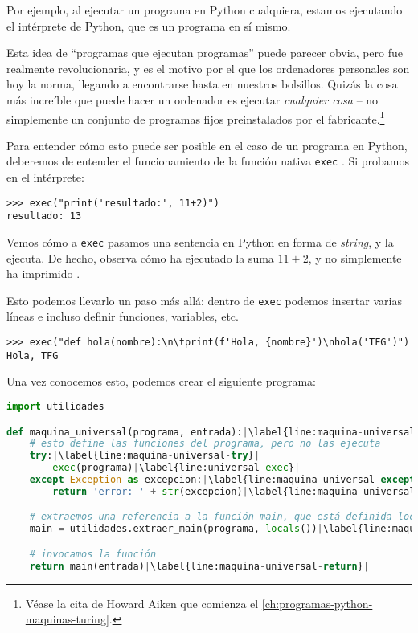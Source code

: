 Por ejemplo, al ejecutar un programa en Python cualquiera, estamos ejecutando el intérprete de Python, que es un programa en sí mismo.

Esta idea de ``programas que ejecutan programas'' puede parecer obvia, pero fue realmente revolucionaria, y es el motivo por el que los ordenadores personales son hoy la norma, llegando a encontrarse hasta en nuestros bolsillos. Quizás la cosa más increíble que puede hacer un ordenador es ejecutar \emph{cualquier cosa} -- no simplemente un conjunto de programas fijos preinstalados por el fabricante.\footnote{Véase la cita de Howard Aiken que comienza el \cref{ch:programas-python-maquinas-turing}.}

Para entender cómo esto puede ser posible en el caso de un programa en Python, deberemos de entender el funcionamiento de la función nativa \texttt{exec} \cite{Lutz2013}. Si probamos en el intérprete:
\begin{lstlisting}[numbers=none,frame=none]
>>> exec("print('resultado:', 11+2)")
resultado: 13
\end{lstlisting}
Vemos cómo a \texttt{exec} pasamos una sentencia en Python en forma de \emph{string}, y la ejecuta. De hecho, observa cómo ha ejecutado la suma $11+2$, y no simplemente ha imprimido .

Esto podemos llevarlo un paso más allá: dentro de \texttt{exec} podemos insertar varias líneas e incluso definir funciones, variables, etc.
\begin{lstlisting}[numbers=none,frame=none]
>>> exec("def hola(nombre):\n\tprint(f'Hola, {nombre}')\nhola('TFG')")
Hola, TFG
\end{lstlisting}
\vspace{-8pt}
Una vez conocemos esto, podemos crear el siguiente programa:
\vspace{8pt}
\begin{lstlisting}[language=Python, caption=\lstinline{maquina_universal.py},label={lst:maquina-universal}]
import utilidades

def maquina_universal(programa, entrada):|\label{line:maquina-universal-main}|
    # esto define las funciones del programa, pero no las ejecuta
    try:|\label{line:maquina-universal-try}|
        exec(programa)|\label{line:universal-exec}|
    except Exception as excepcion:|\label{line:maquina-universal-except}|
        return 'error: ' + str(excepcion)|\label{line:maquina-universal-except-return}|

    # extraemos una referencia a la función main, que está definida localmente
    main = utilidades.extraer_main(programa, locals())|\label{line:maquina-universal-main-ref}|

    # invocamos la función
    return main(entrada)|\label{line:maquina-universal-return}|
\end{lstlisting}

